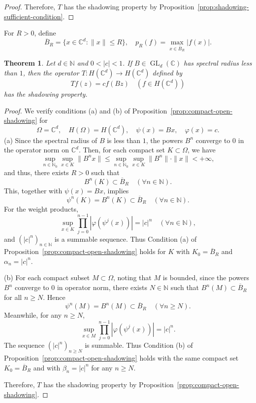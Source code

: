 \documentclass[11pt]{amsart}
\newtheorem{theorem}{Theorem}
\theoremstyle{definition}
\theoremstyle{remark}
\theoremstyle{plain}
\begin{document}
\begin{proof}
Therefore, \(T\) has the shadowing property by
Proposition~\ref{prop:shadowing-sufficient-condition}.
\end{proof}

For \(R>0\), define
\[
\overline{B}_R=\{x\in\mathbb{C}^d:\|x\|\le R\},\quad
p_R(f)=\max_{x\in\overline B_R}|f(x)|.
\]

\begin{theorem}\label{thm:HCd-shadowing}
Let \(d\in\mathbb{N}\) and \(0<|c|<1\).  If
\(B\in \operatorname{GL}_d(\mathbb{C})\) has spectral radius less than \(1\),
then the operator $T: H(\mathbb{C}^{d})\to H(\mathbb{C}^{d})$ defined by
\[
Tf(z)=c f(Bz)
\quad(f\in H(\mathbb{C}^d))
\]
has the shadowing property.
\end{theorem}

\begin{proof}
We verify conditions (a) and (b) of
Proposition~\ref{prop:compact-open-shadowing} for
\[
\Omega=\mathbb{C}^d,
\quad
H(\Omega)=H(\mathbb{C}^d),
\quad
\psi(x)=Bx,
\quad
\varphi(x)=c .
\]
(a) Since the spectral radius of \(B\) is less than \(1\), the powers \(B^n\)
converge to \(0\) in the operator norm on \(\mathbb{C}^d\). Then, for each compact set
\(K\subset\Omega\), we have
\[
\sup_{n\in\mathbb{N}_0}\sup_{x\in K}\|B^nx\|
\leq \sup_{n\in\mathbb{N}_0}\sup_{x\in K}\|B^n\|\cdot \|x\|<+\infty,
\]
and thus, there exists \(R>0\) such that
\[
B^n(K)\subset \overline{B}_R
\quad (\forall n\in \mathbb{N}).
\]
This, together with \(\psi(x)=Bx\), implies
\[
\psi^n(K)=
B^n(K)\subset
\overline{B}_R
\quad (\forall n\in \mathbb{N}).
\]
For the weight products,
\[
\sup_{x\in K}\prod_{j=0}^{n-1}|\varphi(\psi^j(x))|=|c|^n
\quad(\forall n\in\mathbb{N}),
\]
and \((|c|^n)_{n\in\mathbb{N}}\) is a summable sequence.  Thus Condition
{\rm (a)} of Proposition~\ref{prop:compact-open-shadowing} holds for \(K\) with
\(K_0=\overline{B}_R\) and \(\alpha_n=|c|^n\).

\medskip

(b) For each compact subset \(M\subset \Omega\), noting that \(M\) is bounded,
since the powers \(B^n\) converge to \(0\) in operator norm, there exists \(N\in\mathbb{N}\)
such that \(B^n(M)\subset \overline{B}_R\) for all \(n\ge N\).  Hence
\[
\psi^n(M)=B^n(M)\subset \overline{B}_R
\quad(\forall n\ge N).
\]
Meanwhile, for any \(n\ge N\),
\[
\sup_{x\in M}\prod_{j=0}^{n-1}|\varphi(\psi^j(x))|=|c|^n .
\]
The sequence \((|c|^n)_{n\ge N}\) is summable.  Thus Condition {\rm (b)} of
Proposition~\ref{prop:compact-open-shadowing} holds with the same compact set
\(K_0=\overline{B}_R\) and with
\(\beta_n=|c|^n\) for any \(n\ge N\).

Therefore, \(T\) has the shadowing property by
Proposition~\ref{prop:compact-open-shadowing}.
\end{proof}
\end{document}
